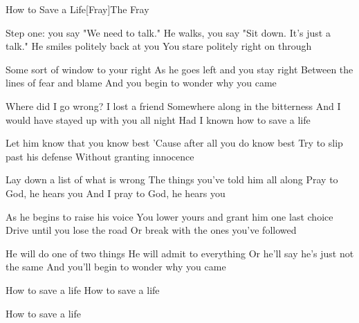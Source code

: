 \documentclass[a4paper,11pt,french]{article}
\begin{document}
\begin{Song}{How to Save a Life}[Fray]{The Fray}
\begin{multicols}{2}
\begin{Verse}
Step one: you say "We need to talk."
He walks, you say "Sit down. It's just a talk."
He smiles politely back at you
You stare politely right on through
\espaceInterStrophe

Some sort of window to your right
As he goes left and you stay right
Between the lines of fear and blame
And you begin to wonder why you came
\end{Verse}
\espaceInterStrophe

\begin{Chorus}
Where did I go wrong? I lost a friend
Somewhere along in the bitterness
And I would have stayed up with you all night
Had I known how to save a life
\end{Chorus}
\espaceInterStrophe

\begin{Verse}
Let him know that you know best
'Cause after all you do know best
Try to slip past his defense
Without granting innocence
\espaceInterStrophe

Lay down a list of what is wrong
The things you've told him all along
Pray to God, he hears you
And I pray to God, he hears you
\end{Verse}
\vfill
\columnbreak

\tochorus
\espaceInterStrophe

\begin{Verse}
As he begins to raise his voice
You lower yours and grant him one last choice
Drive until you lose the road
Or break with the ones you've followed
\espaceInterStrophe

He will do one of two things
He will admit to everything
Or he'll say he's just not the same
And you'll begin to wonder why you came
\end{Verse}
\espaceInterStrophe

\tochorus[x2]
\espaceInterStrophe

\begin{Chorus}
How to save a life
How to save a life
\end{Chorus}
\espaceInterStrophe

\tochorus[x2]
\espaceInterStrophe

\begin{Chorus}
How to save a life
\end{Chorus}
\vfill
~
\end{multicols}


\end{Song}
\end{document}
